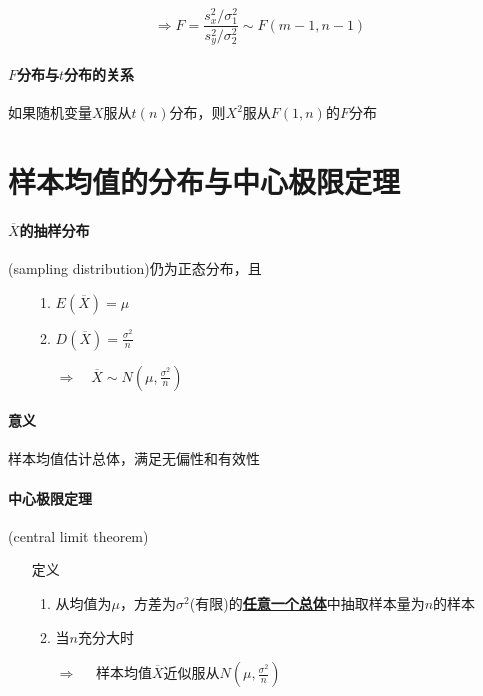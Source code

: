 \documentclass[UTF8,10pt]{book}
\begin{document}
    	$$ \Rightarrow F=\frac{s_{x}^{2} / \sigma_{1}^{2}}{s_{y}^{2} / \sigma_{2}^{2}} \sim F(m-1, n-1) $$
    	


            \paragraph{$F$分布与$t$分布的关系} {\kaishu 如果随机变量$X$服从$t(n)$分布，则$X^2$服从$F(1,n)$的$F$分布}

            
    
    \section{样本均值的分布与中心极限定理}
            \paragraph{$\overline{X}$的抽样分布} (sampling distribution)仍为正态分布，且
                \begin{itemize}
                    \item [] {
                        \begin{enumerate}
                            \item $E(\overline{X}) = \mu$
                            \item $D(\overline{X}) = \frac{\sigma^2}{n} $                            
                            
                            $ \Rightarrow \quad \overline{X} \sim N(\mu,\frac{\sigma^2}{n}) $
                        \end{enumerate}
                    }
                \end{itemize}
            

                \paragraph{意义} {\kaishu 样本均值估计总体，满足无偏性和有效性}

            \paragraph{中心极限定理} (central limit theorem)
                \begin{itemize}
                    \item [定义] {
                        \begin{enumerate}
                            \item 从均值为$\mu$，方差为$\sigma^2$(有限)的\underline{\textbf{任意一个总体}}中抽取样本量为$n$的样本
                            \item 当$n$充分大时
                            
                            $ \Rightarrow \quad  $ 样本均值$\overline{X}$近似服从$N(\mu,\frac{\sigma^2}{n})$
                        \end{enumerate}
                    }
                \end{itemize}
\end{document}
